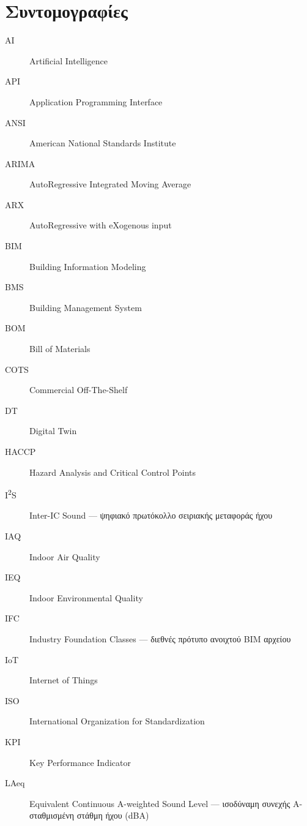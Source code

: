 \chapter*{Συντομογραφίες}
{}

\begin{description}
  \item[\textlatin{AI}] \textlatin{Artificial Intelligence}
  \item[\textlatin{API}] \textlatin{Application Programming Interface}
  \item[\textlatin{ANSI}] \textlatin{American National Standards Institute}
  \item[\textlatin{ARIMA}] \textlatin{AutoRegressive Integrated Moving Average}
  \item[\textlatin{ARX}] \textlatin{AutoRegressive with eXogenous input}
  \item[\textlatin{BIM}] \textlatin{Building Information Modeling}
  \item[\textlatin{BMS}] \textlatin{Building Management System}
  \item[\textlatin{BOM}] \textlatin{Bill of Materials}
  \item[\textlatin{COTS}] \textlatin{Commercial Off-The-Shelf}
  \item[\textlatin{DT}] \textlatin{Digital Twin}
  \item[\textlatin{HACCP}] \textlatin{Hazard Analysis and Critical Control Points}
  \item[\textlatin{I\textsuperscript{2}S}] \textlatin{Inter-IC Sound} --- \textgreek{ψηφιακό πρωτόκολλο σειριακής μεταφοράς ήχου}
  \item[\textlatin{IAQ}] \textlatin{Indoor Air Quality}
  \item[\textlatin{IEQ}] \textlatin{Indoor Environmental Quality}
  \item[\textlatin{IFC}] \textlatin{Industry Foundation Classes} --- \textgreek{διεθνές πρότυπο ανοιχτού} \textlatin{BIM} \textgreek{αρχείου}
  \item[\textlatin{IoT}] \textlatin{Internet of Things}
  \item[\textlatin{ISO}] \textlatin{International Organization for Standardization}
  \item[\textlatin{KPI}] \textlatin{Key Performance Indicator}
  \item[\textlatin{LAeq}] \textlatin{Equivalent Continuous A-weighted Sound Level} --- \textgreek{ισοδύναμη συνεχής Α-σταθμισμένη στάθμη ήχου} (\textlatin{dBA})

\end{description}
